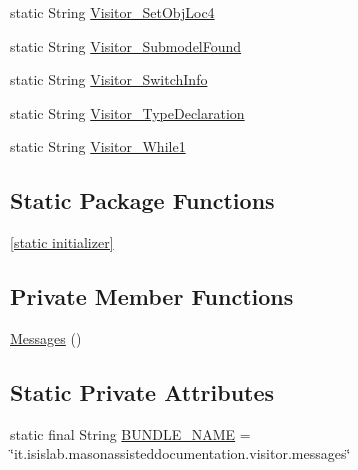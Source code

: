 \begin{DoxyCompactItemize}
\item 
static String \hyperlink{classit_1_1isislab_1_1masonassisteddocumentation_1_1visitor_1_1_messages_ae2d050c851cac0348fb99cfedf405acc}{Visitor\-\_\-\-Set\-Obj\-Loc4}
\item 
static String \hyperlink{classit_1_1isislab_1_1masonassisteddocumentation_1_1visitor_1_1_messages_a4b7db03e6876890446d5bf9c540675ac}{Visitor\-\_\-\-Submodel\-Found}
\item 
static String \hyperlink{classit_1_1isislab_1_1masonassisteddocumentation_1_1visitor_1_1_messages_aaea00ab3f37814d9d9240e135952d763}{Visitor\-\_\-\-Switch\-Info}
\item 
static String \hyperlink{classit_1_1isislab_1_1masonassisteddocumentation_1_1visitor_1_1_messages_aada96700b6bc6b9e83d8241c0f6fc21f}{Visitor\-\_\-\-Type\-Declaration}
\item 
static String \hyperlink{classit_1_1isislab_1_1masonassisteddocumentation_1_1visitor_1_1_messages_abcdee35cefbd746cc562cf6fe451d36d}{Visitor\-\_\-\-While1}
\end{DoxyCompactItemize}
\subsection*{Static Package Functions}
\begin{DoxyCompactItemize}
\item 
\hyperlink{classit_1_1isislab_1_1masonassisteddocumentation_1_1visitor_1_1_messages_acd9cf6acc4975aefcacda4672164b9f9}{\mbox{[}static initializer\mbox{]}}
\end{DoxyCompactItemize}
\subsection*{Private Member Functions}
\begin{DoxyCompactItemize}
\item 
\hyperlink{classit_1_1isislab_1_1masonassisteddocumentation_1_1visitor_1_1_messages_ac526f0ff06875f2fd738bf71ee20e1a2}{Messages} ()
\end{DoxyCompactItemize}
\subsection*{Static Private Attributes}
\begin{DoxyCompactItemize}
\item 
static final String \hyperlink{classit_1_1isislab_1_1masonassisteddocumentation_1_1visitor_1_1_messages_a6d34d3a440f73c5caef8b2ac318a53a5}{B\-U\-N\-D\-L\-E\-\_\-\-N\-A\-M\-E} = \char`\"{}it.\-isislab.\-masonassisteddocumentation.\-visitor.\-messages\char`\"{}
\end{DoxyCompactItemize}


